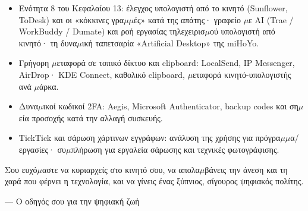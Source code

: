 
\begin{itemize}
  \item Ενότητα 8 του Κεφαλαίου 13: έλεγχος υπολογιστή από το κινητό (Sunflower, ToDesk) και οι «κόκκινες γρα$\mu$$\mu$ές» κατά της απάτης· γραφείο $\mu$ε AI (Trae / WorkBuddy / Dumate) και ροή εργασίας τηλεχειρισ$\mu$ού υπολογιστή από κινητό· τη δυνα$\mu$ική ταπετσαρία «Artificial Desktop» της miHoYo.
  \item Γρήγορη $\mu$εταφορά σε τοπικό δίκτυο και clipboard: LocalSend, IP Messenger, AirDrop· KDE Connect, καθολικό clipboard, $\mu$εταφορά κινητό-υπολογιστής ανά $\mu$άρκα.
  \item Δυνα$\mu$ικοί κωδικοί 2FA: Aegis, Microsoft Authenticator, backup codes και ση$\mu$εία προσοχής κατά την αλλαγή συσκευής.
  \item TickTick και σάρωση χάρτινων εγγράφων: ανάλυση της χρήσης για πρόγρα$\mu$$\mu$α/εργασίες· συ$\mu$πλήρωση για εργαλεία σάρωσης και τεχνικές φωτογράφισης.
\end{itemize}

Σου ευχό$\mu$αστε να κυριαρχείς στο κινητό σου, να απολα$\mu$βάνεις την άνεση και τη χαρά που φέρνει η τεχνολογία, και να γίνεις ένας ξύπνιος, σίγουρος ψηφιακός πολίτης.

— Ο οδηγός σου για την ψηφιακή ζωή
